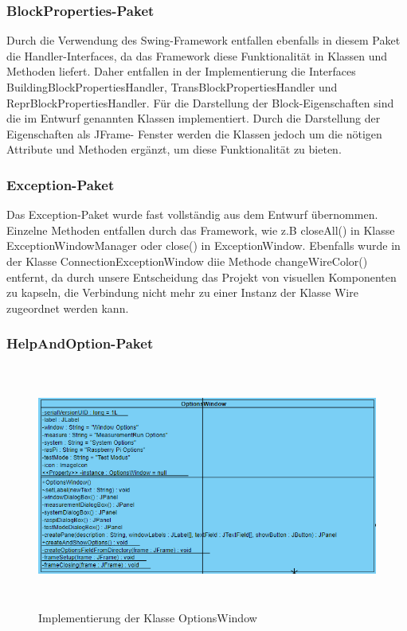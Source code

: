 \documentclass[parskip=full]{scrartcl}
\begin{document}
\subsubsection{BlockProperties-Paket}

Durch die Verwendung des Swing-Framework entfallen ebenfalls in diesem Paket die Handler-Interfaces, da das Framework diese Funktionalität in Klassen und Methoden liefert. Daher entfallen in der Implementierung die Interfaces BuildingBlockPropertiesHandler, TransBlockPropertiesHandler und ReprBlockPropertiesHandler.
Für die Darstellung der Block-Eigenschaften sind die im Entwurf genannten Klassen implementiert. Durch die Darstellung der Eigenschaften als JFrame- Fenster werden die Klassen jedoch um die nötigen Attribute und Methoden ergänzt, um diese Funktionalität zu bieten.

\subsubsection{Exception-Paket}

Das Exception-Paket wurde fast vollständig aus dem Entwurf übernommen. Einzelne Methoden entfallen durch das Framework, wie z.B closeAll() in Klasse ExceptionWindowManager oder close() in ExceptionWindow. 
Ebenfalls wurde in der Klasse ConnectionExceptionWindow diie Methode changeWireColor() entfernt, da durch unsere Entscheidung das Projekt von visuellen Komponenten zu kapseln, die Verbindung nicht mehr zu einer Instanz der Klasse Wire zugeordnet werden kann.

\subsubsection{HelpAndOption-Paket}

\begin{figure}[htbp]
    \begin{center}
        \includegraphics[height = 8cm]{Grafiken/OptionsWindow.png}
        \caption{Implementierung der Klasse OptionsWindow}
        \label{option}
    \end{center}
\end{figure}
\end{document}
